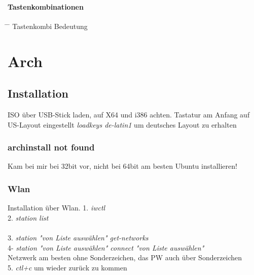 \documentclass[10pt,a4paper,twoside]{book}
\begin{document}
\subsubsection{Tastenkombinationen}
\begin{tabbing}
\hspace*{1mm} \=\hspace*{30mm} \= \kill
\> Tastenkombi \> Bedeutung  \\
\end{tabbing}
\chapter{Arch}
\section{Installation}
ISO über USB-Stick laden, auf X64 und i386 achten.
Tastatur am Anfang auf US-Layout eingestellt
\textit{loadkeys de-latin1} um deutsches Layout zu erhalten
\subsection{archinstall not found}
Kam bei mir bei 32bit vor, nicht bei 64bit
am besten Ubuntu installieren!
\subsection{Wlan}
Installation über Wlan.
1. \textit{iwctl} \\
2. \textit{station list}\\ \\
3. \textit{station "von Liste auswählen" get-networks}\\
4- \textit{station "von Liste auswählen" connect "von Liste auswählen"}\\
\hspace*{3 mm} Netzwerk am besten ohne Sonderzeichen, das PW auch über Sonderzeichen\\
5. \textit{ctl+c} um wieder zurück zu kommen\\
\end{document}

